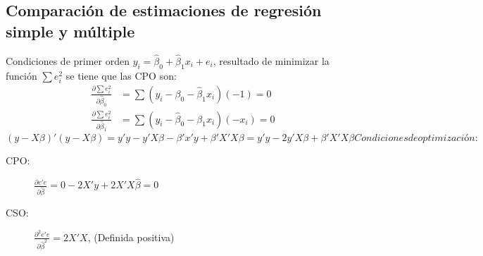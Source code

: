 \subsection{Comparación de estimaciones de regresión simple y múltiple}
\begin{frame}{Condiciones de primer orden}
	$y_i=\widehat{\beta}_0+\widehat{\beta}_1 x_i+e_i$, resultado de
	minimizar la función $\sum e_i^2$ se tiene que las CPO son: 
		\begin{align*}
			\frac{\partial\sum e_i^2}{\partial \widehat{\beta}_0} &= \sum(y_i-\beta_0-\widehat{\beta}_1 x_i)(-1)=0 \\
			\frac{\partial\sum e_i^2}{\partial \widehat{\beta}_1} &= \sum(y_i-\widehat{\beta}_0-\beta_1 x_i)(-x_i)=0
		\end{align*}
	$(y-X\beta)'(y-X\beta)  = y'y-y'X\beta-\beta'x'y+\beta'X'X\beta= y'y-2y'X\beta+\beta'X'X\beta
	Condiciones de optimización:$
		\bigskip
		\begin{description}
			\item[CPO:] $\frac{\partial e'e}{\partial\widehat{\beta}}=0-2X'y+2X'X\widehat{\beta}=0$
			\item[CSO:] $\frac{\partial^2 e'e}{\partial\widehat{\beta}^2}=2X'X$, (Definida positiva)
		\end{description}
\end{frame}

